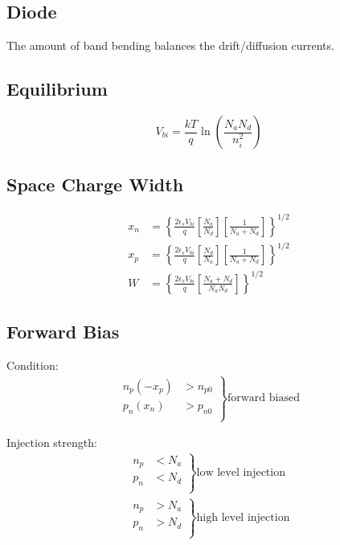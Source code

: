 \documentclass[a4paper, fontsize=8pt, landscape, DIV=1]{scrartcl}
\begin{document}
\begin{multicols*}{4}
  \subsection{Diode}
    The amount of band bending balances the drift/diffusion currents.

  \subsection{Equilibrium}
    \[V_{bi} = \frac{kT}{q}\ln\left(\frac{N_aN_d}{n_i^2}\right)\]
  
  \subsection{Space Charge Width}
    \begin{align*}
      x_n &= \left\{ \frac{2\epsilon_sV_{bi}}{q}\left[\frac{N_a}{N_d}\right]\left[\frac{1}{N_a+N_d}\right] \right\}^{1/2}\\
      x_p &= \left\{ \frac{2\epsilon_sV_{bi}}{q}\left[\frac{N_d}{N_a}\right]\left[\frac{1}{N_a+N_d}\right] \right\}^{1/2} \\
      W  &= \left\{ \frac{2\epsilon_sV_{bi}}{q}\left[ \frac{N_a+N_d}{N_aN_d} \right] \right\}^{1/2}
    \end{align*}

  \subsection{Forward Bias}
    Condition:
    \begin{align*}
      \left. \begin{array}{rl}
        n_p(-x_p) &> n_{p0} \\
        p_n(x_n) &> p_{n0} \\
        \end{array} \right\} \text{forward biased}
    \end{align*} 

    Injection strength:
    \begin{align*}
      \left. \begin{array}{rl}
        n_p &< N_a \\
        p_n &< N_d \\
        \end{array} \right\} \text{low level injection} \\
      \left. \begin{array}{rl}
        n_p &> N_a \\
        p_n &> N_d \\
        \end{array} \right\} \text{high level injection}
    \end{align*} 


\end{multicols*}
\end{document}
